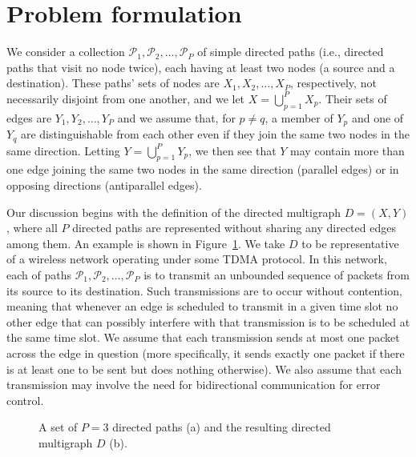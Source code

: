 \documentclass{article}
\begin{document}
\section{Problem formulation}\label{sec:form}

We consider a collection $\mathcal{P}_1,\mathcal{P}_2,\ldots,\mathcal{P}_P$ of
simple directed paths (i.e., directed paths that visit no node twice), each
having at least two nodes (a source and a destination). These paths' sets of
nodes are $X_1,X_2,\ldots,X_P$, respectively, not necessarily disjoint from one
another, and we let $X=\bigcup_{p=1}^PX_p$. Their sets of edges are
$Y_1,Y_2,\ldots,Y_P$ and we assume that, for $p\neq q$, a member of $Y_p$ and
one of $Y_q$ are distinguishable from each other even if they join the same two
nodes in the same direction. Letting $Y=\bigcup_{p=1}^PY_p$, we then see that
$Y$ may contain more than one edge joining the same two nodes in the same
direction (parallel edges) or in opposing directions (antiparallel edges).

Our discussion begins with the definition of the directed multigraph
$D=(X,Y)$, where all $P$ directed paths are represented without sharing any
directed edges among them. An example is shown in Figure~\ref{fig1}. We take
$D$ to be representative of a wireless network operating under some TDMA
protocol. In this network, each of paths
$\mathcal{P}_1,\mathcal{P}_2,\ldots,\mathcal{P}_P$ is to transmit an unbounded
sequence of packets from its source to its destination. Such transmissions are
to occur without contention, meaning that whenever an edge is scheduled to
transmit in a given time slot no other edge that can possibly interfere with
that transmission is to be scheduled at the same time slot. We assume that each
transmission sends at most one packet across the edge in question (more
specifically, it sends exactly one packet if there is at least one to be sent
but does nothing otherwise). We also assume that each transmission may involve
the need for bidirectional communication for error control.

\begin{figure}[t]
\centering
{}
\caption{A set of $P=3$ directed paths (a) and the resulting directed multigraph
$D$ (b).}
\label{fig1}
\end{figure}
\end{document}

